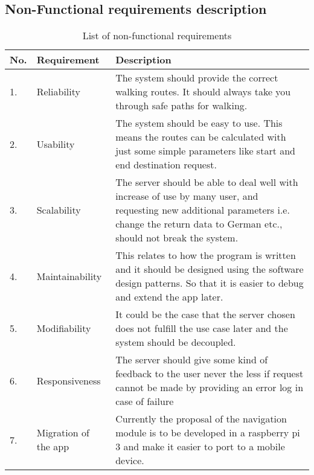         \subsection{Non-Functional requirements description}
            \label{ssec:nonFuncList}
            \begin{table}[h!]
                \centering
                    \begin{tabular}{|p{0.5cm}||p{3cm}|p{11cm}|}
                        \hline
                            No. & Requirement & Description \\
                        \hline
                            1. &  Reliability & The system should provide the
                            correct walking routes. It should always take you through safe paths for 
                            walking.\\
                        \hline
                            2. & Usability & The system should be easy to use. This means the routes can be
                            calculated with just some simple parameters like start and end destination request.\\
                            
                        \hline
                            3. & Scalability & The server should be able to deal well with increase of use by many user,
                            and requesting new additional parameters i.e. change the return data to German etc., 
                            should not break the system.\\    
                        
                        \hline
                            4. & Maintainability & This relates to how the program is written and it 
                            should be designed using the software design patterns. So that it is easier to
                            debug and extend the app later.\\
                        \hline    
                            5. & Modifiability & It could be the case that the server chosen does not 
                            fulfill the use case later and the system should be decoupled.\\
                        \hline
                            6. & Responsiveness & The server should give some kind of feedback to the user
                            never the less if request cannot be made by providing an error log in case of
                            failure\\
                        \hline
                            7. & Migration of the app & Currently the proposal of the navigation module is to be
                            developed in a raspberry pi 3  and make it easier to port to a mobile device.\\ 
                                 
                        \hline    
                    \end{tabular}    
                \caption{List of non-functional requirements}
                \label{table:nonfunctionalRequirements}
            \end{table}   
